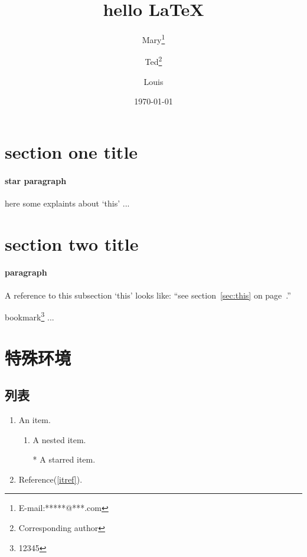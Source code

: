 \documentclass{ctexart}
\title{hello LaTeX}
\author{ Mary\thanks{E-mail:*****@***.com}
\and Ted\thanks{Corresponding author}
\and Louis}
\date{\today}
\begin{document}
\begin{titlepage}
    \maketitle
\end{titlepage}

\newpage

\tableofcontents
\newpage


\section{section one title}
\paragraph{star paragraph}

here\label{sec:this} some explaints about `this' ...

\newpage


\section{section two title}
\paragraph{paragraph}
A reference to this subsection `this' looks like: ``see section~\ref{sec:this} on page~\pageref{sec:this}.''

bookmark\footnote{12345} ...

\section{特殊环境}

\subsection*{列表}

\begin{enumerate}
    \item An item.
          \begin{enumerate}
              \item A nested item.\label{itref}
              \item[*] A starred item.
          \end{enumerate}
    \item Reference(\ref{itref}).
\end{enumerate}
\end{document}
